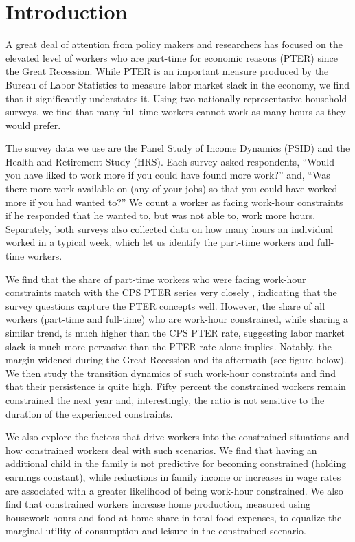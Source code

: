 \section{Introduction}
A great deal of attention from policy makers and researchers has focused on the elevated level of workers who are part-time for economic reasons (PTER) since the Great Recession. While PTER is an important measure produced by the Bureau of Labor Statistics to measure labor market slack in the economy, we find that it significantly understates it. Using two nationally representative household surveys, we find that many full-time workers cannot work as many hours as they would prefer.

The survey data we use are the Panel Study of Income Dynamics (PSID) and the Health and Retirement Study (HRS).  Each survey asked respondents, “Would you have liked to work more if you could have found more work?” and, “Was there more work available on (any of your jobs) so that you could have worked more if you had wanted to?” We count a worker as facing work-hour constraints if he responded that he wanted to, but was not able to, work more hours. Separately, both surveys also collected data on how many hours an individual worked in a typical week, which let us identify the part-time workers and full-time workers.

We find that the share of part-time workers who were facing work-hour constraints match with the CPS PTER series very closely , indicating that the survey questions capture the PTER concepts well.  However, the share of all workers (part-time and full-time) who are work-hour constrained, while sharing a similar trend, is much higher than the CPS PTER rate, suggesting labor market slack is much more pervasive than the PTER rate alone implies.  Notably, the margin widened during the Great Recession and its aftermath (see figure below).  We then study the transition dynamics of such work-hour constraints and find that their persistence is quite high.  Fifty percent the constrained workers remain constrained the next year and, interestingly, the ratio is not sensitive to the duration of the experienced constraints.

We also explore the factors that drive workers into the constrained situations and how constrained workers deal with such scenarios.  We find that having an additional child in the family is not predictive for becoming constrained (holding earnings constant), while reductions in family income or increases in wage rates are associated with a greater likelihood of being work-hour constrained.  We also find that constrained workers increase home production, measured using housework hours and food-at-home share in total food expenses, to equalize the marginal utility of consumption and leisure in the constrained scenario.